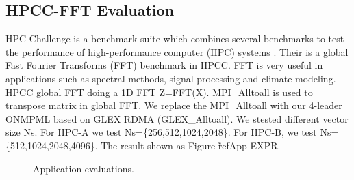\subsection{HPCC-FFT Evaluation}
HPC Challenge is a benchmark suite which combines several benchmarks to test the performance of high-performance computer (HPC) systems \cite{luszczek2006hpc}.
Their is a global Fast Fourier Transforms (FFT) benchmark in HPCC.
FFT is very useful in applications such as spectral methods, signal processing and climate modeling.
HPCC global FFT doing a 1D FFT Z=FFT(X). 
MPI\_Alltoall is used to transpose matrix in global FFT.
We replace the MPI\_Alltoall with our 4-leader ONMPML based on GLEX RDMA (GLEX\_Alltoall).
We stested different vector size Ns. For HPC-A we test Ns=\{256,512,1024,2048\}.
For HPC-B, we test Ns=\{512,1024,2048,4096\}.
The result shown as Figure \~ref{App-EXPR}.
\begin{figure}[!htb]
  \centering
  \caption{Application evaluations.}
	\label{App-EXPR}
	\vspace{0.1in}
\end{figure}